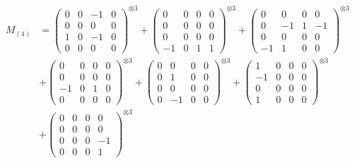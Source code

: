 \documentclass{article}
\newcommand{\Mthree}{%
    M_{(4)}
}
\begin{document}
        \newpage
        
        \footnotesize{
        \begin{align}
        \Mthree
        &= \label{Rs16-Rc11-Solution-20-c1} \begin{pmatrix} 0 & 0 & -1 & 0 \\ 0 & 0 & 0 & 0 \\ 1 & 0 & -1 & 0 \\ 0 & 0 & 0 & 0 \end{pmatrix}^{\otimes 3} 
            + \begin{pmatrix} 0 & 0 & 0 & 0 \\ 0 & 0 & 0 & 0 \\ 0 & 0 & 0 & 0 \\ -1 & 0 & 1 & 1 \end{pmatrix}^{\otimes 3} 
            + \begin{pmatrix} 0 & 0 & 0 & 0 \\ 0 & -1 & 1 & -1 \\ 0 & 0 & 0 & 0 \\ -1 & 1 & 0 & 0 \end{pmatrix}^{\otimes 3} \\
        &+ \label{Rs16-Rc11-Solution-20-c4} \begin{pmatrix} 0 & 0 & 0 & 0 \\ 0 & 0 & 0 & 0 \\ -1 & 0 & 1 & 0 \\ 0 & 0 & 0 & 0 \end{pmatrix}^{\otimes 3} 
            + \begin{pmatrix} 0 & 0 & 0 & 0 \\ 0 & 1 & 0 & 0 \\ 0 & 0 & 0 & 0 \\ 0 & -1 & 0 & 0 \end{pmatrix}^{\otimes 3} 
            + \begin{pmatrix} 1 & 0 & 0 & 0 \\ -1 & 0 & 0 & 0 \\ 0 & 0 & 0 & 0 \\ 1 & 0 & 0 & 0 \end{pmatrix}^{\otimes 3} \\
        &+ \label{Rs16-Rc11-Solution-20-c7} \begin{pmatrix} 0 & 0 & 0 & 0 \\ 0 & 0 & 0 & 0 \\ 0 & 0 & 0 & -1 \\ 0 & 0 & 0 & 1 \end{pmatrix}^{\otimes 3} 

\end{align}}
\end{document}
